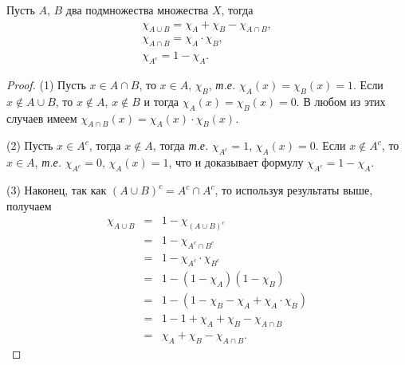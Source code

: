 \begin{lemma}\label{chi_A+chi_B}
    Пусть $A$, $B$ два подмножества множества $X$, тогда 
    \begin{eqnarray*}
        \chi_{A \cup B} = \chi_A + \chi_B - \chi_{A\cap B},\\
        \chi_{A \cap B} = \chi_A \cdot \chi_B,\\
        \chi_{A^c} = 1 - \chi_A.
    \end{eqnarray*}
\end{lemma}

\begin{proof} (1) Пусть $x \in A\cap B$, то $x\in A$, $\chi_B$, \textit{т.е.} $\chi_A(x) = \chi_B(x) = 1$. Если $x \notin A \cup B$, то $x\notin A$, $x\notin B$ и тогда $\chi_A(x) = \chi_B(x) = 0$. В любом из этих случаев имеем $\chi_{A \cap B}(x) = \chi_A(x) \cdot \chi_B(x).$ 

(2) Пусть $x \in A^c$, тогда $x\notin A$, тогда \textit{т.е.} $\chi_{A^c}=1$, $\chi_A(x) = 0$. Если $x \notin A^c$, то $x \in A$, \textit{т.е.} $\chi_{A^c}=0$, $\chi_A(x) = 1$, что и доказывает формулу $\chi_{A^c} = 1 - \chi_A.$

(3) Наконец, так как $(A \cup B)^c = A^c \cap A^c$, то используя результаты выше, получаем
\begin{eqnarray*}
    \chi_{A \cup B} &=& 1 - \chi_{(A\cup B)^c} \\
    &=& 1 - \chi_{A^c \cap B^c} \\
    &=& 1- \chi_{A^c} \cdot \chi_{B^c} \\
    &=& 1 - (1- \chi_A)(1-\chi_B) \\
    &=& 1 - (1-\chi_B - \chi_A + \chi_{A}\cdot \chi_B) \\
    &=& 1 - 1 + \chi_A + \chi_B - \chi_{A \cap B} \\
    &=&\chi_A + \chi_B - \chi_{A \cap B}.
\end{eqnarray*}
\end{proof}


